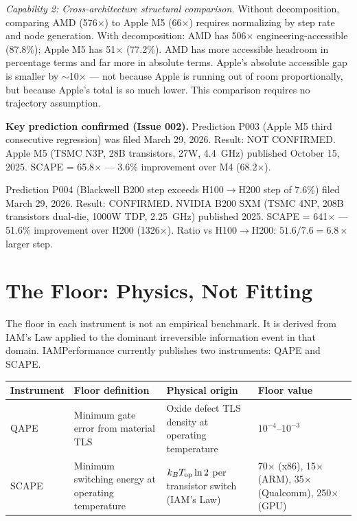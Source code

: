 \documentclass[12pt,a4paper]{article}
\begin{document}
\emph{Capability 2: Cross-architecture structural comparison.}
Without decomposition, comparing AMD (576$\times$) to Apple M5 (66$\times$) requires
normalizing by step rate and node generation. With decomposition:
AMD has 506$\times$ engineering-accessible (87.8\%); Apple M5 has 51$\times$ (77.2\%).
AMD has more accessible headroom in percentage terms and far more in absolute terms.
Apple's absolute accessible gap is smaller by $\sim$10$\times$ --- not because
Apple is running out of room proportionally, but because Apple's total is so much lower.
This comparison requires no trajectory assumption.

\textbf{Key prediction confirmed (Issue 002).}
Prediction P003 (Apple M5 third consecutive regression) was filed March 29, 2026.
Result: NOT CONFIRMED. Apple M5 (TSMC N3P, 28B transistors, 27W, 4.4~GHz)
published October 15, 2025. SCAPE = 65.8$\times$ --- 3.6\% improvement over M4 (68.2$\times$).

Prediction P004 (Blackwell B200 step exceeds H100$\rightarrow$H200 step of 7.6\%)
filed March 29, 2026. Result: CONFIRMED. NVIDIA B200 SXM (TSMC 4NP, 208B transistors
dual-die, 1000W TDP, 2.25~GHz) published 2025. SCAPE = 641$\times$ --- 51.6\% improvement
over H200 (1326$\times$). Ratio vs H100$\rightarrow$H200: $51.6 / 7.6 = 6.8\times$ larger step.

\newpage

\section{The Floor: Physics, Not Fitting}

The floor in each instrument is not an empirical benchmark. It is derived from
IAM's Law applied to the dominant irreversible information event in that domain.
IAMPerformance currently publishes two instruments: QAPE and SCAPE.

\begin{center}
\begin{tabular}{p{2.2cm}p{3.2cm}p{4.2cm}p{2.8cm}}
\toprule
\textbf{Instrument} & \textbf{Floor definition} & \textbf{Physical origin} & \textbf{Floor value} \\
\midrule
QAPE & Minimum gate error from material TLS & Oxide defect TLS density at operating temperature & $10^{-4}$--$10^{-3}$ \\[0.5em]
SCAPE & Minimum switching energy at operating temperature & $k_B T_{\rm op} \ln 2$ per transistor switch (IAM's Law) & 70$\times$ (x86), 15$\times$ (ARM), 35$\times$ (Qualcomm), 250$\times$ (GPU) \\
\bottomrule
\end{tabular}
\end{center}
\end{document}
